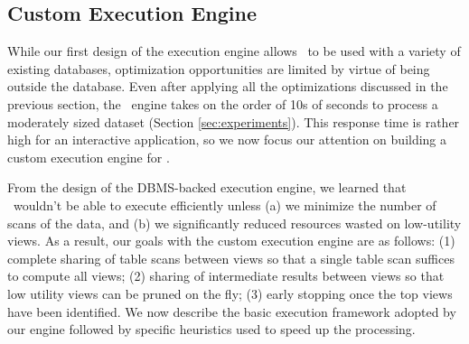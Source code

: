 

\subsection{Custom Execution Engine}
\label{sec:in_memory_execution_engine}

While our first design of the execution engine allows \VizRecDB\ to be
used with a variety of existing databases, optimization opportunities are
limited by virtue of being outside the database.
Even after applying all the optimizations discussed in the previous section, the
\VizRecDB\ engine takes on the order of 10s of seconds to process a
moderately sized dataset  (Section \ref{sec:experiments}).
This response time is rather high for an interactive application, so we
now focus our attention on building a 
custom execution engine for \VizRecDB.

From the design of the DBMS-backed execution engine, we learned that \VizRecDB\
wouldn't be able to execute efficiently unless (a) we minimize the number of scans of the
data, and (b) we significantly reduced resources wasted on low-utility views.
As a result, our goals with the custom execution engine are as follows:
(1) complete sharing of table scans between views so that a single table scan
suffices to compute all views; 
(2) sharing of intermediate results between views so that low utility views can
be pruned on the fly; 
(3) early stopping once the top views have been identified. 
We now describe the
basic execution framework adopted by our engine followed by specific heuristics
used to speed up the processing.

